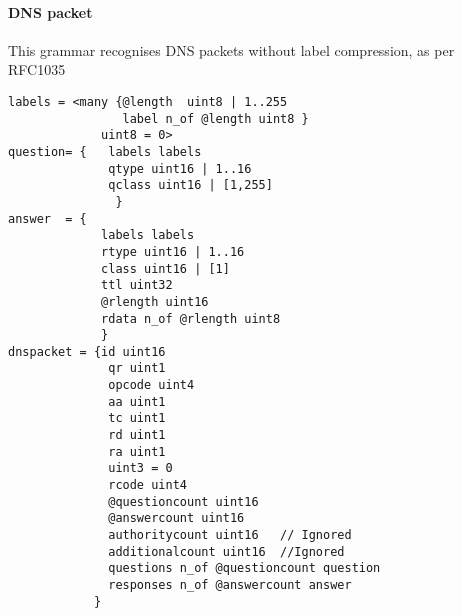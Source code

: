 \paragraph{DNS packet}
This grammar recognises DNS packets without label compression, as per RFC1035 
\begin{verbatim}
labels = <many {@length  uint8 | 1..255 
                label n_of @length uint8 }
             uint8 = 0>
question= {   labels labels
              qtype uint16 | 1..16 
              qclass uint16 | [1,255]
               }
answer  = {
             labels labels
             rtype uint16 | 1..16
             class uint16 | [1]
             ttl uint32
             @rlength uint16 
             rdata n_of @rlength uint8 
             }
dnspacket = {id uint16
              qr uint1
              opcode uint4
              aa uint1 
              tc uint1
              rd uint1
              ra uint1
              uint3 = 0
              rcode uint4
              @questioncount uint16
              @answercount uint16
              authoritycount uint16   // Ignored
              additionalcount uint16  //Ignored       
              questions n_of @questioncount question         
              responses n_of @answercount answer
            }
\end{verbatim}


